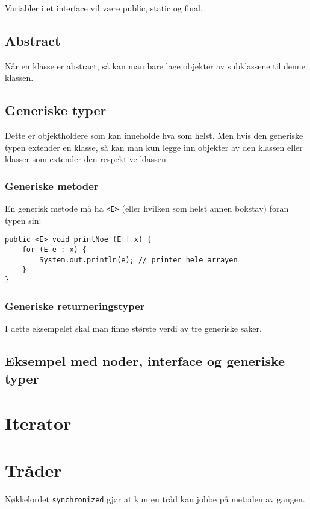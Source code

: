 \documentclass[10pt,a4paper]{article}
\begin{document}
Variabler i et interface vil være public, static og final.

\subsection{Abstract}
Når en klasse er abstract, så kan man bare lage objekter av subklassene til denne klassen. 

\subsection{Generiske typer}
Dette er objektholdere som kan inneholde hva som helst. Men hvis den generiske typen extender en klasse, så kan man kun legge inn objekter av den klassen eller klasser som extender den respektive klassen.

\subsubsection{Generiske metoder}
En generisk metode må ha \texttt{<E>} (eller hvilken som helst annen bokstav) foran typen sin:
\begin{lstlisting}
public <E> void printNoe (E[] x) {
	for (E e : x) {
		System.out.println(e); // printer hele arrayen
	}
}
\end{lstlisting}

\subsubsection{Generiske returneringstyper}
I dette eksempelet skal man finne største verdi av tre generiske saker.


\subsection{Eksempel med noder, interface og generiske typer}


\section{Iterator}


\section{Tråder}

Nøkkelordet \texttt{synchronized} gjør at kun en tråd kan jobbe på metoden av gangen.
\end{document}
